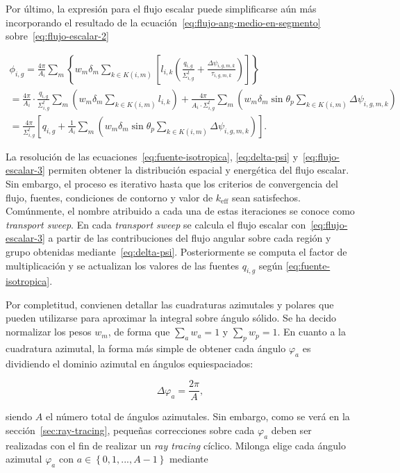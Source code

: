 \documentclass[11pt]{article}
\numberwithin{equation}{section}
\begin{document}
Por último, la expresi\'on para el flujo escalar puede simplificarse aún m\'as incorporando el resultado de la ecuación~\eqref{eq:flujo-ang-medio-en-segmento} sobre~\eqref{eq:flujo-escalar-2}

\begin{multline} \label{eq:flujo-escalar-3}
 \phi_{i,g} =
 \frac{4\pi}{A_i} \sum_m \left\lbrace w_m \delta_m \sum_{k \in K(i,m)} \left[ l_{i,k} \left( \frac{q_{i,g}}{\Sigma^t_{i,g}} + \frac{\Delta \psi_{i,g,m,k}}{\tau_{i,g,m,k}} \right) \right] \right\rbrace \\ 
 = \frac{4\pi}{A_i} \cdot \frac{q_{i,g}}{\Sigma^t_{i,g}} \sum_m \left( w_m \delta_m \sum_{k \in K(i,m)} l_{i,k} \right) + \frac{4\pi}{A_i \cdot \Sigma^t_{i,g}} \sum_m \left( w_m \delta_m \sin \theta_p \sum_{k \in K(i,m)} \Delta \psi_{i,g,m,k} \right) \\ 
 = \frac{4\pi}{\Sigma^t_{i,g}} \left[ q_{i,g} + \frac{1}{A_i} \sum_m \left( w_m \delta_m \sin \theta_p \sum_{k \in K(i,m)} \Delta \psi_{i,g,m,k} \right) \right]
 .
\end{multline}

La resolución de las ecuaciones~\eqref{eq:fuente-isotropica}, \eqref{eq:delta-psi} y~\eqref{eq:flujo-escalar-3} permiten obtener la distribución espacial y energética del flujo escalar. Sin embargo, el proceso es iterativo hasta que los criterios de convergencia del flujo, fuentes, condiciones de contorno y valor de $k_{\text{eff}}$ sean satisfechos. Comúnmente, el nombre atribuido a cada una de estas iteraciones se conoce como \emph{transport sweep}. En cada \emph{transport sweep} se calcula el flujo escalar con~\eqref{eq:flujo-escalar-3} a partir de las contribuciones del flujo angular sobre cada región y grupo obtenidas mediante~\eqref{eq:delta-psi}. Posteriormente se computa el factor de multiplicación y se actualizan los valores de las fuentes $q_{i,g}$ seg\'un \eqref{eq:fuente-isotropica}.

Por completitud, convienen detallar las cuadraturas azimutales y polares que pueden utilizarse para aproximar la integral sobre \'angulo s\'olido. Se ha decido normalizar los pesos $w_m$, de forma que $\sum_a w_a = 1$ y $\sum_p w_p = 1$. En cuanto a la cuadratura azimutal, la forma más simple de obtener cada ángulo $\varphi_a$ es dividiendo el dominio azimutal en ángulos equiespaciados:

\begin{equation}
 \Delta \varphi_a = \frac{2\pi}{A},
\end{equation}

\noindent
siendo $A$ el número total de ángulos azimutales. Sin embargo, como se verá en la sección~\ref{sec:ray-tracing}, pequeñas correcciones sobre cada $\varphi_a$ deben ser realizadas con el fin de realizar un \emph{ray tracing} cíclico. Milonga elige cada ángulo azimutal $\varphi_a$ con $a \in \left\lbrace 0, 1, ..., A-1 \right\rbrace$ mediante
\end{document}
